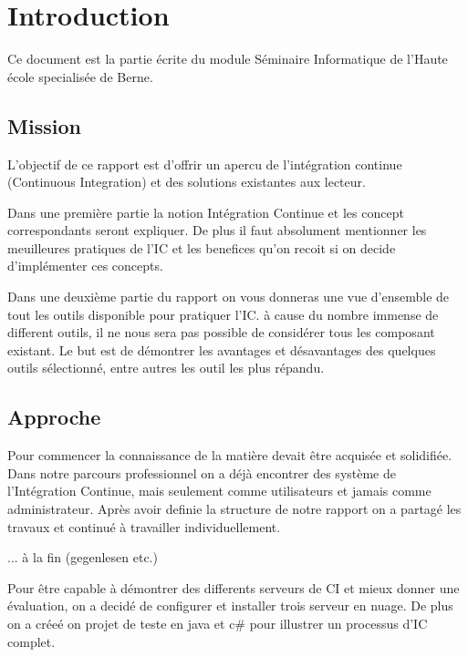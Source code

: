 \chapter{Introduction}
\label{chap:introduction}
Ce document est la partie écrite du module Séminaire Informatique de l'Haute école specialisée de Berne.

\section{Mission}
\label{sec:intro_mission}
L'objectif de ce rapport est d'offrir un apercu de l'intégration continue (Continuous Integration) et des solutions existantes aux lecteur.

Dans une première partie la notion Intégration Continue et les concept correspondants seront expliquer. De plus il faut absolument mentionner les meuilleures pratiques de l'IC et les benefices qu'on recoit si on decide d'implémenter ces concepts.

Dans une deuxième partie du rapport on vous donneras une vue d'ensemble de tout les outils disponible pour pratiquer l'IC. à cause du nombre immense de different outils, il ne nous sera pas possible de considérer tous les composant existant. Le but est de démontrer les avantages et désavantages des quelques outils sélectionné, entre autres les outil les plus répandu. 

\section{Approche}
\label{sec:intro_approche}

Pour commencer la connaissance de la matière devait être acquisée et solidifiée. Dans notre parcours professionnel on a déjà encontrer des système de l'Intégration Continue, mais seulement comme utilisateurs et jamais comme administrateur.
Après avoir definie la structure de notre rapport on a partagé les travaux et continué à travailler individuellement.

... à la fin (gegenlesen etc.)

Pour être capable à démontrer des differents serveurs de CI et mieux donner une évaluation, on a decidé de configurer et installer trois serveur en nuage. De plus on a créeé on projet de teste en java et c\# pour illustrer un processus d'IC complet.
